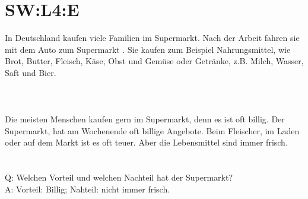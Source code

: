 \section{SW:L4:E}
In Deutschland kaufen viele Familien im Supermarkt. Nach der Arbeit  fahren sie mit dem Auto  zum Supermarkt . Sie kaufen zum Beispiel Nahrungsmittel, wie  Brot, Butter, Fleisch, Käse, Obst und Gemüse oder Getränke, z.B. Milch, Wasser, Saft und Bier. \\
\\
\\
\\
Die meisten Menschen kaufen gern im Supermarkt, denn  es ist oft billig. Der Supermarkt, hat am Wochenende oft billige Angebote. Beim Fleischer,  im Laden oder auf dem Markt ist es oft teuer. Aber die Lebensmittel sind immer frisch.  \\
\\
\\
Q: Welchen Vorteil und welchen Nachteil hat der Supermarkt? \\
A: Vorteil: Billig; Nahteil: nicht immer frisch. \\

